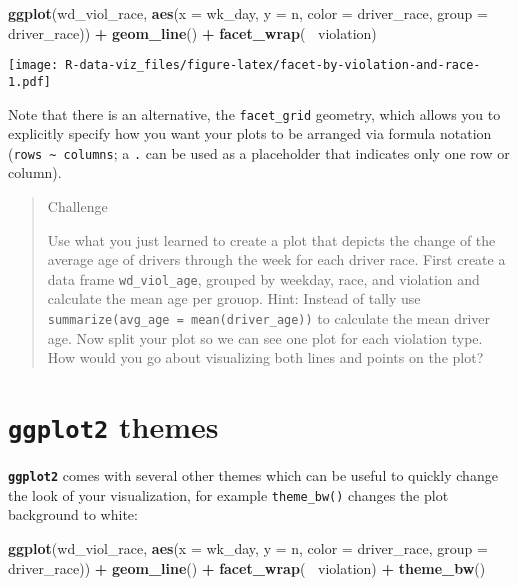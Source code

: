 \documentclass[]{book}
\newenvironment{Shaded}{\begin{snugshade}}{\end{snugshade}}
\newcommand{\DataTypeTok}[1]{\textcolor[rgb]{0.13,0.29,0.53}{#1}}
\newcommand{\KeywordTok}[1]{\textcolor[rgb]{0.13,0.29,0.53}{\textbf{#1}}}
\newcommand{\NormalTok}[1]{#1}
\newcommand{\OperatorTok}[1]{\textcolor[rgb]{0.81,0.36,0.00}{\textbf{#1}}}
\newcommand{\StringTok}[1]{\textcolor[rgb]{0.31,0.60,0.02}{#1}}
\begin{document}
\begin{Shaded}
\begin{Highlighting}[]
\KeywordTok{ggplot}\NormalTok{(wd_viol_race, }\KeywordTok{aes}\NormalTok{(}\DataTypeTok{x =}\NormalTok{ wk_day, }\DataTypeTok{y =}\NormalTok{ n, }\DataTypeTok{color =}\NormalTok{ driver_race, }\DataTypeTok{group =}\NormalTok{ driver_race)) }\OperatorTok{+}
\StringTok{  }\KeywordTok{geom_line}\NormalTok{() }\OperatorTok{+}\StringTok{ }
\StringTok{  }\KeywordTok{facet_wrap}\NormalTok{(}\OperatorTok{~}\StringTok{ }\NormalTok{violation)}
\end{Highlighting}
\end{Shaded}

\texttt{[image: R-data-viz\_files/figure-latex/facet-by-violation-and-race-1.pdf]}

Note that there is an alternative, the \texttt{facet\_grid} geometry, which allows you to explicitly specify how you want your plots to be
arranged via formula notation (\texttt{rows\ \textasciitilde{}\ columns}; a \texttt{.} can be used as
a placeholder that indicates only one row or column).

\begin{quote}
Challenge

Use what you just learned to create a plot that depicts
the change of the average age of drivers through the week
for each driver race.
First create a data frame \texttt{wd\_viol\_age}, grouped by weekday, race, and
violation and calculate the mean age per grouop.
Hint: Instead of tally use \texttt{summarize(avg\_age\ =\ mean(driver\_age))}
to calculate the mean driver age.
Now split your plot so we can see one plot for each violation type.
How would you go about visualizing both lines and points on the plot?
\end{quote}

\hypertarget{ggplot2-themes}{%
\section{\texorpdfstring{\textbf{\texttt{ggplot2}} themes}{ggplot2 themes}}\label{ggplot2-themes}}

\textbf{\texttt{ggplot2}}
comes with several other themes which can be useful to quickly change the look
of your visualization, for example \texttt{theme\_bw()} changes the plot background to white:

\begin{Shaded}
\begin{Highlighting}[]
\KeywordTok{ggplot}\NormalTok{(wd_viol_race, }\KeywordTok{aes}\NormalTok{(}\DataTypeTok{x =}\NormalTok{ wk_day, }\DataTypeTok{y =}\NormalTok{ n, }\DataTypeTok{color =}\NormalTok{ driver_race, }\DataTypeTok{group =}\NormalTok{ driver_race)) }\OperatorTok{+}
\StringTok{  }\KeywordTok{geom_line}\NormalTok{() }\OperatorTok{+}\StringTok{ }
\StringTok{  }\KeywordTok{facet_wrap}\NormalTok{(}\OperatorTok{~}\StringTok{ }\NormalTok{violation) }\OperatorTok{+}
\StringTok{  }\KeywordTok{theme_bw}\NormalTok{()}
\end{Highlighting}
\end{Shaded}
\end{document}
